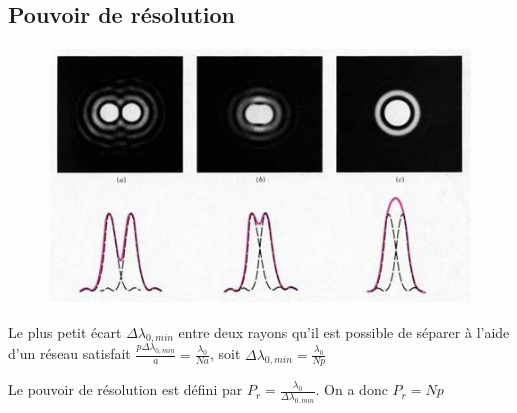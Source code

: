 \documentclass[a4paper,12pt]{book}
\begin{document}
\subsection{Pouvoir de résolution}
\begin{figure}[h]
    \begin{center}
    \includegraphics[scale=0.4]{tr144.jpg}
    \end{center}
\end{figure}
Le plus petit écart $\Delta\lambda_{0,min}$ entre deux rayons qu'il est possible de séparer à 
l'aide d'un réseau satisfait $\frac{p\Delta\lambda_{0,min}}{a}=\frac{\lambda_0}{Na}$, soit $\Delta\lambda_{0,min}=\frac{\lambda_0}{Np}$

Le pouvoir de résolution est défini par $P_r=\frac{\lambda_0}{\Delta\lambda_{0,min}}$. On a donc $P_r=Np$
\end{document}
